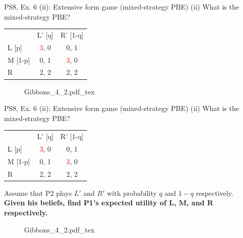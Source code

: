 \begin{frame}{PS8, Ex. 6 (ii): Extensive form game (mixed-strategy PBE)}
    (ii) What is the mixed-strategy PBE? \vspace{-8pt}
    \begin{multicols}{2}
      \begin{table}
        \begin{tabular}{l|c|c|}
          \multicolumn{1}{c}{} & \multicolumn{1}{c}{L' [q]} & \multicolumn{1}{c}{R' [1-q]} \\\cline{2-3}
          L [p]   & \textcolor{red}{3}, 0 & 0, \color{blue}1 \\\cline{2-3}
          M [1-p] & 0, \color{blue}1 & \textcolor{red}{3}, 0 \\\cline{2-3}
          R       & 2, \color{blue}2 & 2, \color{blue}2 \\\cline{2-3}
        \end{tabular}
      \end{table} \vspace{-4pt}
      \vfill\null\columnbreak
      \begin{figure}[!h]
        \center {}
        {Gibbons_4_2.pdf_tex}
      \end{figure}
      \vfill\null
    \end{multicols}
\end{frame}
\begin{frame}{PS8, Ex. 6 (ii): Extensive form game (mixed-strategy PBE)}
    (ii) What is the mixed-strategy PBE? \vspace{-8pt}
    \begin{multicols}{2}
      \begin{table}
        \begin{tabular}{l|c|c|}
          \multicolumn{1}{c}{} & \multicolumn{1}{c}{L' [q]} & \multicolumn{1}{c}{R' [1-q]} \\\cline{2-3}
          L [p]   & \textcolor{red}{3}, 0 & 0, \color{blue}1 \\\cline{2-3}
          M [1-p] & 0, \color{blue}1 & \textcolor{red}{3}, 0 \\\cline{2-3}
          R       & 2, \color{blue}2 & 2, \color{blue}2 \\\cline{2-3}
        \end{tabular}
      \end{table} \vspace{-4pt}
      Assume that P2 plays $L'$ and $R'$ with probability $q$ and $1-q$ respectively.\\\smallskip
      \textbf{Given his beliefs, find P1's expected utility of $\bm{L}$, $\bm{M}$, and $\bm{R}$ respectively.}
      \vfill\null\columnbreak
      \begin{figure}[!h]
        \center {}
        {Gibbons_4_2.pdf_tex}
      \end{figure}
      \vfill\null
    \end{multicols}
\end{frame}
